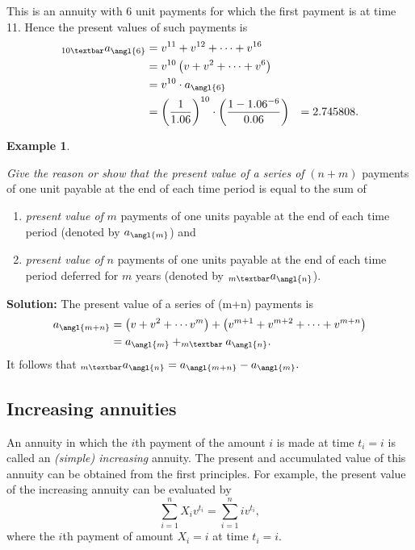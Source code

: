 \documentclass[landscape, 20pt]{extreport}
\theoremstyle{definition}
\theoremstyle{definition}
\newtheorem{example}{Example}[chapter]
\theoremstyle{definition}
\theoremstyle{definition}
\theoremstyle{remark}
\begin{document}
This is an annuity with 6 unit payments for which the first payment is
at time 11. Hence the present values of such payments is
\[\begin{aligned}
    _{10 \textbar}a_\angl{6}
  &= v^{11} + v^{12} + \cdots +v^{16}  \\
    &= v^{10}  \left( v + v^2 + \cdots + v^6  \right) \\
    &= v^{10} \cdot  a_\angl{6} \\
    &= \left(\frac{1}{1.06}\right)^{10} \cdot \left( \frac{1- 1.06^{-6}}{0.06} \right)
    &= 2.745808.\end{aligned}\]

\newpage \begin{example}
\protect\hypertarget{exm:unlabeled-div-34}{}\label{exm:unlabeled-div-34}

\emph{Give the reason or show that the present value of a series of} \((n+m)\)
payments of one unit payable at the end of each time period is equal to
the sum of

\begin{enumerate}
\def\labelenumi{\arabic{enumi}.}
\item
  \emph{present value of} \(m\) payments of one units payable at the end of
  each time period (denoted by \(a_\angl{m}\)) and
\item
  \emph{present value of} \(n\) payments of one units payable at the end of
  each time period deferred for \(m\) years (denoted by
  \(_{m \textbar}a_\angl{n}\)).
\end{enumerate}

\end{example}

\textbf{Solution:} The present value of a series of (m+n) payments is
\[\begin{aligned}
a_\angl{m+n} &=  \left( v + v^2 + \cdots  v^m\right) + \left( v^{m+1} + v^{m+2} + \cdots +v^{m+n} \right) \\
&= a_\angl{m} + _{m \textbar}a_\angl{n}.\end{aligned}\] It follows that
\(_{m \textbar}a_\angl{n} = a_\angl{m+n} - a_\angl{m}.\)

\newpage \hypertarget{increasing-annuities}{%
\subsection{Increasing annuities}\label{increasing-annuities}}

An annuity in which the \(i\)th payment of the amount \(i\) is made at time
\(t_i = i\) is called an \emph{(simple) increasing} annuity. The present and
accumulated value of this annuity can be obtained from the first
principles. For example, the present value of the increasing annuity can
be evaluated by \[\sum_{i=1}^n X_i v^{t_i} = \sum_{i=1}^n i v^{t_i},\]
where the \(i\)th payment of amount \(X_i = i\) at time \(t_i = i\).
\end{document}
